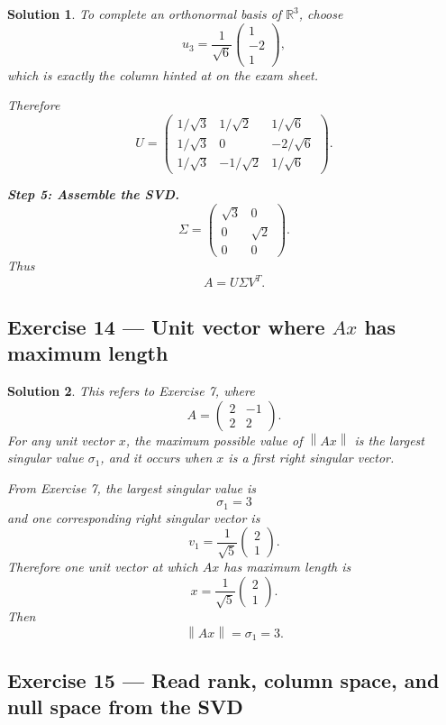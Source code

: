 \documentclass[11pt,a4paper]{article}
\theoremstyle{sol}
\newtheorem*{solution}{Solution}
\newcommand{\R}{\mathbb{R}}
\newcommand{\norm}[1]{\left\|#1\right\|}
\begin{document}
\begin{solution}
To complete an orthonormal basis of $\R^3$, choose
\[
u_3=\frac{1}{\sqrt6}\begin{pmatrix}1\\-2\\1\end{pmatrix},
\]
which is exactly the column hinted at on the exam sheet.

Therefore
\[
U=
\begin{pmatrix}
1/\sqrt3&1/\sqrt2&1/\sqrt6\\
1/\sqrt3&0&-2/\sqrt6\\
1/\sqrt3&-1/\sqrt2&1/\sqrt6
\end{pmatrix}.
\]

\textbf{Step 5: Assemble the SVD.}
\[
\Sigma=
\begin{pmatrix}
\sqrt3&0\\
0&\sqrt2\\
0&0
\end{pmatrix}.
\]
Thus
\[
\boxed{
A=U\Sigma V^T.
}
\]
\end{solution}

\clearpage
\subsection*{Exercise 14 --- Unit vector where $Ax$ has maximum length}

\begin{solution}
This refers to Exercise 7, where
\[
A=\begin{pmatrix}2&-1\\2&2\end{pmatrix}.
\]
For any unit vector $x$, the maximum possible value of $\norm{Ax}$ is the largest singular value $\sigma_1$, and it occurs when $x$ is a first right singular vector.

From Exercise 7, the largest singular value is
\[
\sigma_1=3
\]
and one corresponding right singular vector is
\[
v_1=\frac{1}{\sqrt5}\begin{pmatrix}2\\1\end{pmatrix}.
\]
Therefore one unit vector at which $Ax$ has maximum length is
\[
\boxed{x=\frac{1}{\sqrt5}\begin{pmatrix}2\\1\end{pmatrix}.}
\]
Then
\[
\norm{Ax}=\sigma_1=3.
\]
\end{solution}

\clearpage
\subsection*{Exercise 15 --- Read rank, column space, and null space from the SVD}
\end{document}

